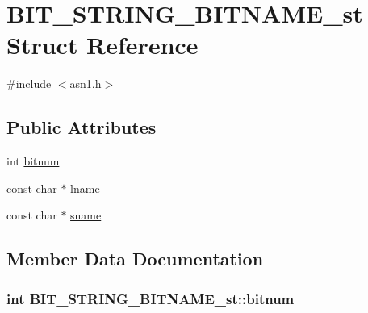 \hypertarget{struct_b_i_t___s_t_r_i_n_g___b_i_t_n_a_m_e__st}{}\section{B\+I\+T\+\_\+\+S\+T\+R\+I\+N\+G\+\_\+\+B\+I\+T\+N\+A\+M\+E\+\_\+st Struct Reference}
\label{struct_b_i_t___s_t_r_i_n_g___b_i_t_n_a_m_e__st}


{\ttfamily \#include $<$asn1.\+h$>$}

\subsection*{Public Attributes}
\begin{DoxyCompactItemize}
\item 
int \hyperlink{struct_b_i_t___s_t_r_i_n_g___b_i_t_n_a_m_e__st_adbddb7cc8584fbb8ae3803eb6d54eec8}{bitnum}
\item 
const char $\ast$ \hyperlink{struct_b_i_t___s_t_r_i_n_g___b_i_t_n_a_m_e__st_a7b6403eb8f9e092395526bd981150531}{lname}
\item 
const char $\ast$ \hyperlink{struct_b_i_t___s_t_r_i_n_g___b_i_t_n_a_m_e__st_a78a12a66f7da99aeb5e7a3b07cc411cf}{sname}
\end{DoxyCompactItemize}


\subsection{Member Data Documentation}
\subsubsection[{\texorpdfstring{bitnum}{bitnum}}]{\setlength{\rightskip}{0pt plus 5cm}int B\+I\+T\+\_\+\+S\+T\+R\+I\+N\+G\+\_\+\+B\+I\+T\+N\+A\+M\+E\+\_\+st\+::bitnum}\hypertarget{struct_b_i_t___s_t_r_i_n_g___b_i_t_n_a_m_e__st_adbddb7cc8584fbb8ae3803eb6d54eec8}{}\label{struct_b_i_t___s_t_r_i_n_g___b_i_t_n_a_m_e__st_adbddb7cc8584fbb8ae3803eb6d54eec8}
